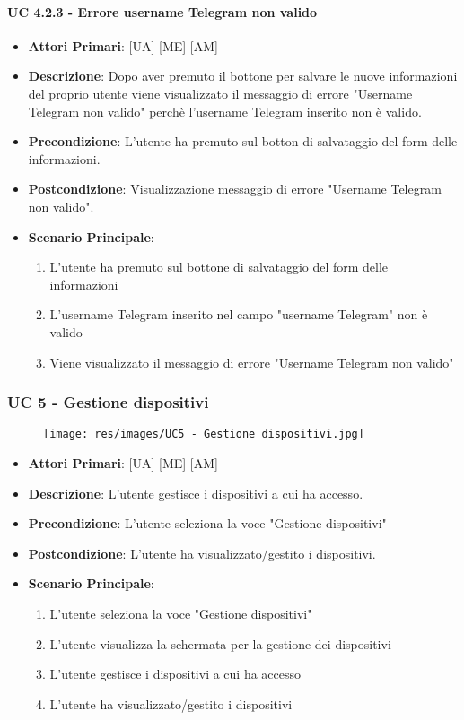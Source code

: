 			\paragraph{UC 4.2.3 - Errore username Telegram non valido}
			\begin{itemize}
				\item \textbf{Attori Primari}: [UA] [ME] [AM]
				\item \textbf{Descrizione}: Dopo aver premuto il bottone per salvare le nuove informazioni del proprio utente viene visualizzato il messaggio di errore "Username Telegram non valido" perchè l'username Telegram inserito non è valido. 
				\item \textbf{Precondizione}: L'utente ha premuto sul botton di salvataggio del form delle informazioni.
				\item \textbf{Postcondizione}: Visualizzazione messaggio di errore "Username Telegram non valido".
				\item \textbf{Scenario Principale}:
				\begin{enumerate}
					\item{L'utente ha premuto sul bottone di salvataggio del form delle informazioni}
					\item{L'username Telegram inserito nel campo "username Telegram" non è valido}
					\item{Viene visualizzato il messaggio di errore "Username Telegram non valido"}
				\end{enumerate}	
			\end{itemize}

		\subsubsection{UC 5 - Gestione dispositivi}
		
		\begin{figure}[t!]
			\centering
			\texttt{[image: res/images/UC5 - Gestione dispositivi.jpg]}
		\end{figure}
		
		\begin{itemize}
			\item \textbf{Attori Primari}: [UA] [ME] [AM]
			\item \textbf{Descrizione}: L'utente gestisce i dispositivi a cui ha accesso.
			\item \textbf{Precondizione}: L'utente seleziona la voce "Gestione dispositivi"
			\item \textbf{Postcondizione}: L'utente ha visualizzato/gestito i dispositivi.
			\item \textbf{Scenario Principale}:
			\begin{enumerate}
				\item{L'utente seleziona la voce "Gestione dispositivi"}
				\item{L'utente visualizza la schermata per la gestione dei dispositivi}
				\item{L'utente gestisce i dispositivi a cui ha accesso}
				\item{L'utente ha visualizzato/gestito i dispositivi}
			\end{enumerate}
		\end{itemize}
			
